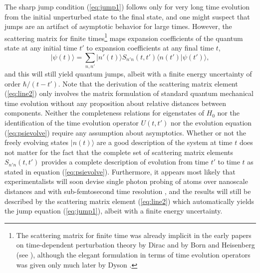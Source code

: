 \documentclass[final,3p,12pt]{elsarticle3}
\begin{document}
The sharp jump condition (\ref{eq:jump1}) follows only for very long time 
evolution from the initial unperturbed state to the final state, and one might 
suspect that jumps are an artifact of asymptotic behavior for large times. However, 
the scattering matrix for finite times\footnote{The scattering matrix for finite 
time was already implicit in the early papers on time-dependent perturbation theory 
by Dirac \cite{dirac1a,dirac1b} and by Born and Heisenberg (see \cite{BV,BC}), 
although the elegant formulation in terms of time evolution operators was given 
only much later by Dyson \cite{dyson}.} 
maps expansion coefficients of the quantum state at any initial time $t'$ to 
expansion coefficients at any final time $t$,
\begin{equation}\label{eq:psievolve}
\bm{|}\psi(t)\bm{\rangle}=\sum_{n,n'}\bm{|}n'(t)\bm{\rangle} 
S_{n'n}(t,t')\bm{\langle} n(t')\bm{|}\psi(t')\bm{\rangle},
\end{equation}
and this will still yield quantum jumps, albeit with a finite energy uncertainty
of order $\hbar/(t-t')$. Note that the derivation of the scattering matrix 
element (\ref{eq:line2}) only involves the matrix formulation of standard quantum 
mechanical time evolution without any proposition about relative distances between 
components. Neither the completeness relations for eigenstates of $H_0$ nor the 
identification of the time evolution operator $U(t,t')$ nor the evolution equation
(\ref{eq:psievolve}) require any assumption about asymptotics. 
Whether or not the freely evolving states $\bm{|}n(t)\bm{\rangle}$ are a good description 
of the system at time $t$ does not matter for the fact that the complete set of 
scattering matrix elements $S_{n'n}(t,t')$ provides a complete description of 
evolution from time $t'$ to time $t$ as stated in equation (\ref{eq:psievolve}).
 Furthermore, it appears most likely that experimentalists will soon devise single 
photon probing \cite{1pem1,1pem2,1pem3,1pspec1,1pspec2} of atoms over nanoscale 
distances and with sub-femtosecond time resolution \cite{atto1,atto2}, and the 
results will still be described by the scattering matrix element (\ref{eq:line2}) 
which automatically yields the jump equation (\ref{eq:jump1}), albeit with 
a finite energy uncertainty.
\end{document}
